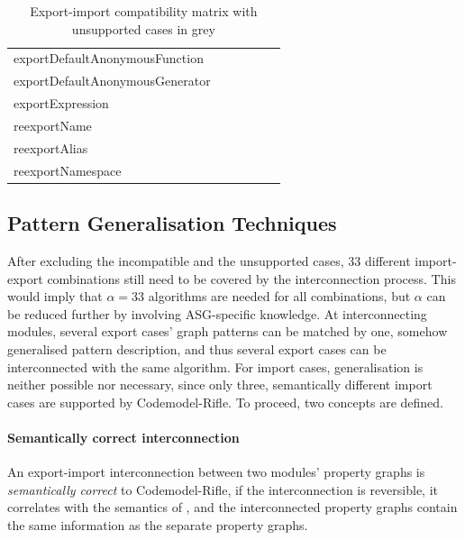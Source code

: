\begin{table}[!htb]
\begin{tabular}{l|cccgg}
		{exportDefaultAnonymousFunction}		& \nop & \nop & \yep & \nop & \yep \\
		\rowcolor{grey}
		{exportDefaultAnonymousGenerator}		& \nop & \nop & \yep & \nop & \yep \\
		{exportExpression}									& \nop & \nop & \nop & \nop & \yep \\
		{reexportName}											& \yep & \yep & \nop & \yep & \yep \\
		\rowcolor{grey}
		{reexportAlias}											& \yep & \yep & \nop & \yep & \yep \\
		{reexportNamespace}									& \yep & \yep & \yep & \yep & \yep \\
		\hline
	\end{tabular}

	\caption{Export-import compatibility matrix with unsupported cases in grey}
	\label{table:export-import-compatibility}
\end{table}


\subsection{Pattern Generalisation Techniques}

After excluding the incompatible and the unsupported cases, $33$ different import-export combinations still need to be covered by the interconnection process. This would imply that $\alpha = 33$ algorithms are needed for all combinations, but $\alpha$ can be reduced further by involving ASG-specific knowledge. At interconnecting modules, several export cases' graph patterns can be matched by one, somehow generalised pattern description, and thus several export cases can be interconnected with the same algorithm. For import cases, generalisation is neither possible nor necessary, since only three, semantically different import cases are supported by Codemodel-Rifle. To proceed, two concepts are defined.

\paragraph{Semantically correct interconnection}

An export-import interconnection between two modules' property graphs is \emph{semantically correct} to Codemodel-Rifle, if the interconnection is reversible, it correlates with the semantics of \es, and the interconnected property graphs contain the same information as the separate property graphs.

